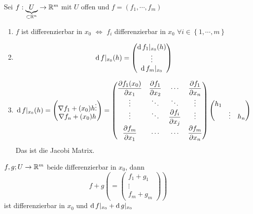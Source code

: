 \begin{Sat}
  Sei $f:\underbrace{U}_{\subset\mathbb{R}^n}\rightarrow\mathbb{R}^m$ mit $U$ offen und $f=(f_1,\cdots,f_m)$
  \begin{enumerate}
    \item $f$ ist differenzierbar in $x_0$ $\iff$ $f_i$ differenzierbar in $x_0$ $\forall i\in \left\{ 1,\cdots,m \right\}$
    \item
      \[\operatorname{d} f|_{x_0}(h)= \begin{pmatrix}
        \operatorname{d} f_1|_{x_0}(h)\\
        \vdots \\
        \operatorname{d} f_m|_{x_0}
      \end{pmatrix}\]
    \item 
      \[\operatorname{d} f|_{x_0}(h)= \begin{pmatrix}
        \nabla f_1+(x_0)h
        \vdots \\
        \nabla f_n+(x_0)h
      \end{pmatrix} = 
      \begin{pmatrix}
        \dfrac{\partial f_1(x_0)}{\partial x_1} & \dfrac{\partial f_1}{\partial x_2} & \cdots & \dfrac{\partial f_1}{\partial x_n} \\
        \vdots & \ddots & \ddots & \vdots \\
        \vdots & \ddots & \dfrac{\partial f_i}{\partial x_j} & \vdots \\
        \dfrac{\partial f_m}{\partial x_1} & \cdots & \cdots & \dfrac{\partial f_m}{\partial x_n} \\
      \end{pmatrix} \begin{pmatrix}
        h_1 \\ & \vdots & h_n
      \end{pmatrix}
      \]
      Das ist die Jacobi Matrix.
  \end{enumerate}
\end{Sat}
\begin{Bem}
  $f,g;U\rightarrow\mathbb{R}^m$ beide differenzierbar in $x_0$, dann
  \[f+g\left( = \begin{pmatrix}
    f_1+g_1\\
    \vdots \\
    f_m+g_m
  \end{pmatrix} \right)\]
  ist differenzierbar in $x_0$ und $\operatorname{d} f|_{x_0}+\operatorname{d} g|_{x_0}$
\end{Bem}
